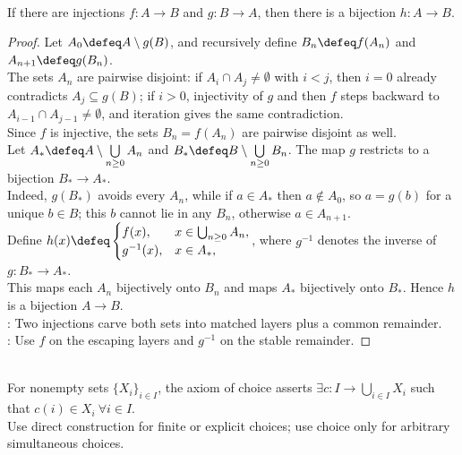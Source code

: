 \begin{theorem} \label{thm:schroeder-bernstein} \\
If there are injections $f:A\to B$ and $g:B\to A$, then there is a bijection $h:A\to B$.
\begin{proof}
Let $A_0\defeq A\setminus g(B)$, and recursively define $B_n\defeq f(A_n)$ and $A_{n+1}\defeq g(B_n)$.\\
The sets $A_n$ are pairwise disjoint: if $A_i\cap A_j\neq\emptyset$ with $i<j$, then $i=0$ already contradicts $A_j\subseteq g(B)$; if $i>0$, injectivity of $g$ and then $f$ steps backward to $A_{i-1}\cap A_{j-1}\neq\emptyset$, and iteration gives the same contradiction.\\
Since $f$ is injective, the sets $B_n=f(A_n)$ are pairwise disjoint as well.\\
Let $A_*\defeq A\setminus\bigcup\limits_{n\geq0}A_n$ and $B_*\defeq B\setminus\bigcup\limits_{n\geq0}B_n$. The map $g$ restricts to a bijection $B_*\to A_*$.\\
Indeed, $g(B_*)$ avoids every $A_n$, while if $a\in A_*$ then $a\notin A_0$, so $a=g(b)$ for a unique $b\in B$; this $b$ cannot lie in any $B_n$, otherwise $a\in A_{n+1}$.\\
Define $h(x)\defeq
\begin{cases}
f(x), & x\in\bigcup_{n\geq0}A_n,\\
g^{-1}(x), & x\in A_*,
\end{cases}$, where $g^{-1}$ denotes the inverse of $g:B_*\to A_*$.\\
This maps each $A_n$ bijectively onto $B_n$ and maps $A_*$ bijectively onto $B_*$. Hence $h$ is a bijection $A\to B$.\\
: Two injections carve both sets into matched layers plus a common remainder.\\
: Use $f$ on the escaping layers and $g^{-1}$ on the stable remainder.
\end{proof}
\end{theorem}

\begin{principle} \label{princ:axiom-of-choice-analysis} \\
For nonempty sets $\{X_i\}_{i\in I}$, the axiom of choice asserts $\exists c:I\to\bigcup\limits_{i\in I}X_i$ such that $c(i)\in X_i\ \forall i\in I$.\\
Use direct construction for finite or explicit choices; use choice only for arbitrary simultaneous choices.
\end{principle}

